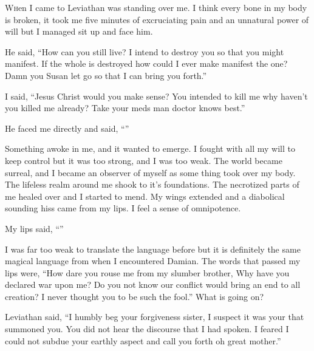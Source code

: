 \lettrine[lines=2,lraise=0]{W}hen I came to Leviathan was standing over me. I think every bone in my body is broken, it took me five minutes of excruciating pain and an unnatural power of will but I managed sit up and face him.

He said, ``How can you still live? I intend to destroy you so that you might manifest. If the whole is destroyed how could I ever make manifest the one? Damn you Susan let go so that I can bring you forth.''

I said, ``Jesus Christ would you make sense? You intended to kill me why haven't you killed me already? Take your meds man doctor knows best.''


He faced me directly and said, ``''

Something awoke in me, and it wanted to emerge. I fought with all my will to keep control but it was too strong, and I was too weak. The world became surreal, and I became an observer of myself as some thing took over my body. The lifeless realm around me shook to it's foundations. The necrotized parts of me healed over and I started to mend. My wings extended and a diabolical sounding hiss came from my lips. I feel a sense of omnipotence.

My lips said, ``''

I was far too weak to translate the language before but it is definitely the same magical language from when I encountered Damian. The words that passed my lips were, ``How dare you rouse me from my slumber brother, Why have you declared war upon me? Do you not know our conflict would bring an end to all creation? I never thought you to be such the fool.'' What is going on?

Leviathan said, ``I humbly beg your forgiveness sister, I suspect it was your  that summoned you. You did not hear the discourse that I had spoken. I feared I could not subdue your earthly aspect and call you forth oh great mother.''

